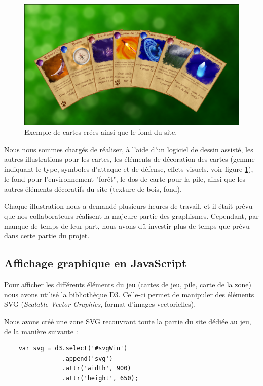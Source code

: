 \documentclass[12pt]{report}
\begin{document}
    \begin{figure}[h!]
     	\centering
       	\includegraphics[scale=0.45]{cards.png}
       	\caption{Exemple de cartes crées ainsi que le fond du site.}
       	\label{fig:cartes}
    \end{figure}

    Nous nous sommes chargés de réaliser, à l'aide d'un logiciel de dessin assisté, les autres illustrations pour les cartes, les éléments de décoration des cartes (gemme indiquant le type, symboles d'attaque et de défense, effets visuels. voir figure \ref{fig:cartes}), le fond pour l'environnement "forêt", le dos de carte pour la pile, ainsi que les autres éléments décoratifs du site (texture de bois, fond).

    Chaque illustration nous a demandé plusieurs heures de travail, et il était prévu que nos collaborateurs réalisent la majeure partie des graphismes. Cependant, par manque de temps de leur part, nous avons dû investir plus de temps que prévu dans cette partie du projet.

    \subsection{Affichage graphique en JavaScript}
		Pour afficher les différents éléments du jeu (cartes de jeu, pile, carte de la zone) nous avons utilisé la bibliothèque D3. Celle-ci permet de manipuler des éléments SVG (\textit{Scalable Vector Graphics}, format d'images vectorielles).

    Nous avons créé une zone SVG recouvrant toute la partie du site dédiée au jeu, de la manière suivante :

    \begin{verbatim}
    var svg = d3.select('#svgWin')
                .append('svg')
                .attr('width', 900)
                .attr('height', 650);
    \end{verbatim}
\end{document}
